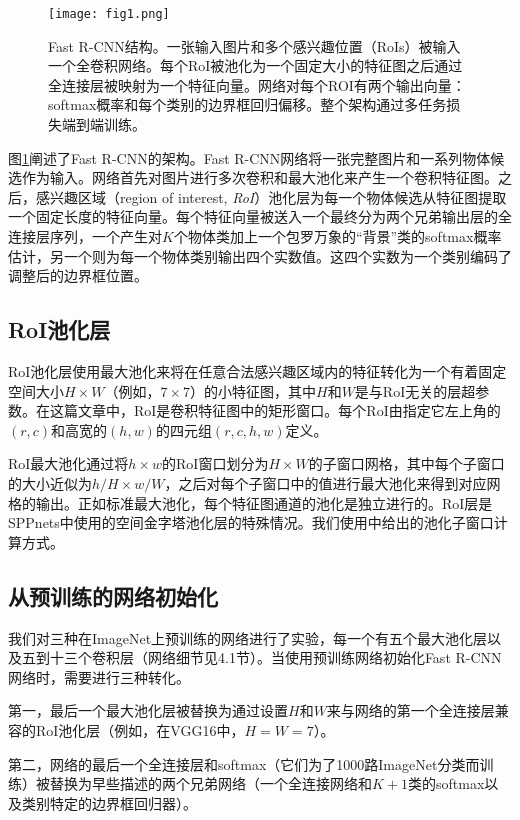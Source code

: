 \documentclass[../main]{subfile}
\begin{document}
\begin{figure}[bh]
    \centering
    \texttt{[image: fig1.png]}
    \caption{Fast R-CNN结构。一张输入图片和多个感兴趣位置（RoIs）被输入一个全卷积网络。每个RoI被池化为一个固定大小的特征图之后通过全连接层被映射为一个特征向量。网络对每个ROI有两个输出向量：softmax概率和每个类别的边界框回归偏移。整个架构通过多任务损失端到端训练。}
    \label{fig:img1}
\end{figure}

图\ref{fig:img1}阐述了Fast R-CNN的架构。Fast R-CNN网络将一张完整图片和一系列物体候选作为输入。网络首先对图片进行多次卷积和最大池化来产生一个卷积特征图。之后，感兴趣区域（region of interest, \textit{RoI}）池化层为每一个物体候选从特征图提取一个固定长度的特征向量。每个特征向量被送入一个最终分为两个兄弟输出层的全连接层序列，一个产生对$K$个物体类加上一个包罗万象的“背景”类的softmax概率估计，另一个则为每一个物体类别输出四个实数值。这四个实数为一个类别编码了调整后的边界框位置。

\subsection{RoI池化层}

RoI池化层使用最大池化来将在任意合法感兴趣区域内的特征转化为一个有着固定空间大小$H\times W$（例如，$7\times 7$）的小特征图，其中$H$和$W$是与RoI无关的层超参数。在这篇文章中，RoI是卷积特征图中的矩形窗口。每个RoI由指定它左上角的$(r, c)$和高宽的$(h, w)$的四元组$(r, c, h, w)$定义。

RoI最大池化通过将$h \times w$的RoI窗口划分为$H \times W$的子窗口网格，其中每个子窗口的大小近似为$h/H \times w/W$，之后对每个子窗口中的值进行最大池化来得到对应网格的输出。正如标准最大池化，每个特征图通道的池化是独立进行的。RoI层是SPPnets\cite{spp}中使用的空间金字塔池化层的特殊情况。我们使用\cite{spp}中给出的池化子窗口计算方式。

\subsection{从预训练的网络初始化}

我们对三种在ImageNet上预训练的网络进行了实验，每一个有五个最大池化层以及五到十三个卷积层（网络细节见4.1节）。当使用预训练网络初始化Fast R-CNN网络时，需要进行三种转化。

第一，最后一个最大池化层被替换为通过设置$H$和$W$来与网络的第一个全连接层兼容的RoI池化层（例如，在VGG16中，$H=W=7$）。

第二，网络的最后一个全连接层和softmax（它们为了1000路ImageNet分类而训练）被替换为早些描述的两个兄弟网络（一个全连接网络和$K+1$类的softmax以及类别特定的边界框回归器）。
\end{document}
